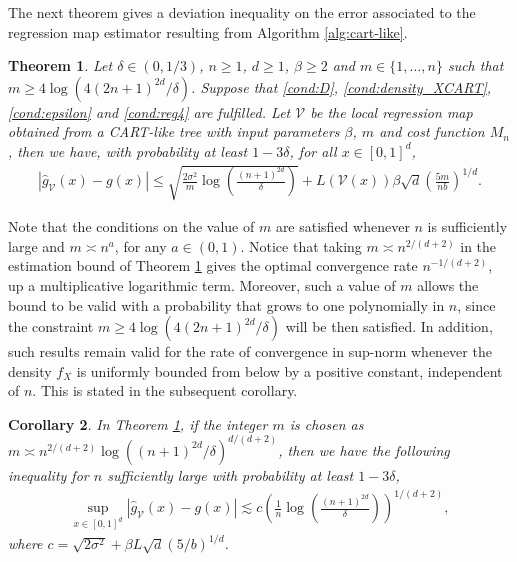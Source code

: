 \documentclass[paper=a4, fontsize=11pt]{scrartcl}
\newtheorem{theorem}{Theorem}
\newtheorem{corollary}[theorem]{Corollary}
\begin{document}
The next theorem gives a deviation inequality on the error associated to the regression map estimator resulting from Algorithm \ref{alg:cart-like}. 


\begin{theorem}\label{th_cart_like1}
Let  $\delta \in (0,1/3) $, $n\geq 1$, $d\geq 1$, $\beta\geq 2$ and $m\in \{1,\ldots,  n\}$ such  that $m\geq  4\log(4(2n+1)^{2d}/\delta )$. Suppose that \ref{cond:D}, \ref{cond:density_XCART}, \ref{cond:epsilon} and \ref{cond:reg4} are fulfilled. Let $\mathcal V$ be the local regression map obtained from a CART-like tree with input parameters $\beta $, $m$ and cost function $M_n$, then we have, with probability at least $1-3\delta$, for all $x \in [0,1]^d$,
    \begin{align*} 
            |  \hat g_\mathcal V (x) - g(x)  | \leq \sqrt { \frac{2 \sigma ^2  } {  m}\log\left( \frac{(n+1) ^{2d}}{ \delta } \right)} + L(\mathcal{V}(x))  \beta \sqrt{d} \left(\frac{5 m}{ n b}\right)^{1/d}.
    \end{align*}
\end{theorem}

Note that the conditions on the value of $m$ are satisfied whenever $n$ is sufficiently large and $m\asymp n^a $, 
 for any $a\in (0,1)$. Notice that taking $m \asymp n^{2/(d+2)}$ in the estimation bound of Theorem \ref{th_cart_like1} gives the optimal convergence rate $n^{-1/(d+2)}$, up a multiplicative logarithmic term. Moreover, such a value of $m$ allows the bound to be valid with a probability that grows to one polynomially in $n$, since the constraint $m \geq 4\log(4(2n+1)^{2d}/\delta )$ will be then satisfied.
In addition, such results remain valid for the rate of convergence in sup-norm whenever the density $f_X$ is uniformly bounded from below by a positive constant, independent of $n$. This is stated in the subsequent corollary.


\begin{corollary}\label{cor_cart_like1}
In Theorem \ref{th_cart_like1}, if the integer $m$ is chosen as $m \asymp n^{2/(d+2)} \log((n+1)^{2d}/\delta)^{d/(d+2)}$, then we have the following inequality for $n$ sufficiently large with probability at least $1-3\delta$, 
   \begin{align*}
      \sup_{x\in [0,1]^d} | \hat g_{\mathcal V}(x) - g(x)|  \lesssim c \left( \frac{1}{n} \log\left(\frac{(n+1)^{2d}}{\delta}\right)  \right)^{1/(d+2)},
   \end{align*}
  where $c =   \sqrt{2\sigma^2} + \beta L \sqrt{d} ({5}/ b )^{1/d}$.
\end{corollary}
\end{document}
